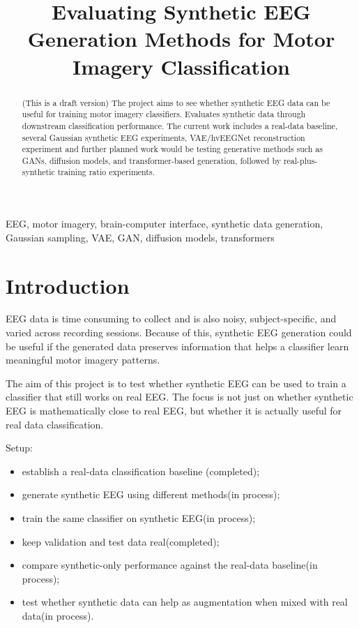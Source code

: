 \documentclass[conference]{IEEEtran}
\title{
Evaluating Synthetic EEG Generation Methods for Motor Imagery Classification
}
\author{
\IEEEauthorblockN{Alzbeta Rehakova}
\IEEEauthorblockA{
MSc Artificial Intelligence\
Queen Mary University of London\
}
}
\begin{document}
\maketitle

\begin{abstract}
(This is a draft version) The project aims to see whether synthetic EEG data can be useful for training motor imagery classifiers. Evaluates synthetic data through downstream classification performance. The current work includes a real-data baseline, several Gaussian synthetic EEG experiments, VAE/hvEEGNet reconstruction experiment and further planned work would be testing generative methods such as GANs, diffusion models, and transformer-based generation, followed by real-plus-synthetic training ratio experiments.
\end{abstract}

\begin{IEEEkeywords}
EEG, motor imagery, brain-computer interface, synthetic data generation, Gaussian sampling, VAE, GAN, diffusion models, transformers
\end{IEEEkeywords}

\section{Introduction}

EEG data is time consuming to collect and is also noisy, subject-specific, and varied across recording sessions. Because of this, synthetic EEG generation could be useful if the generated data preserves information that helps a classifier learn meaningful motor imagery patterns.

The aim of this project is to test whether synthetic EEG can be used to train a classifier that still works on real EEG. The focus is not just on whether synthetic EEG is mathematically close to real EEG, but whether it is actually useful for real data classification.

\vspace{0.5em}

Setup:

\begin{itemize}
\item establish a real-data classification baseline (completed);
\item generate synthetic EEG using different methods(in process);
\item train the same classifier on synthetic EEG(in process);
\item keep validation and test data real(completed);
\item compare synthetic-only performance against the real-data baseline(in process);
\item test whether synthetic data can help as augmentation when mixed with real data(in process).
\end{itemize}
\end{document}
